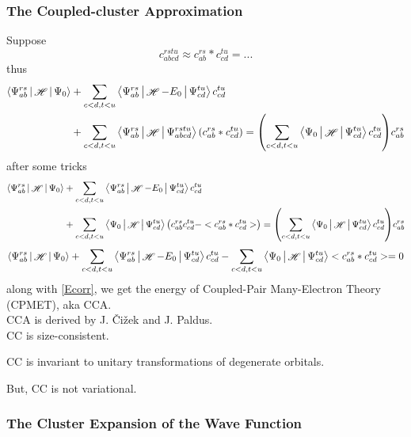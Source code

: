 \documentclass[a4paper]{article}
\DeclareMathOperator{\sH}{\mathscr{H}}
\numberwithin{equation}{section}
\begin{document}
\subsubsection{The Coupled-cluster Approximation}
Suppose
\begin{equation}\label{key}
c_{abcd}^{rstu} \approx c_{ab}^{rs} * c_{cd}^{tu} = ...
\end{equation}
thus
\begin{equation}\label{key}
\begin{aligned}
\Braket{\Psi_{ab}^{rs} | \sH | \Psi_0} &+ \sum_{c<d, t<u} \Braket{\Psi_{ab}^{rs} | \sH - E_0 | \Psi_{cd}^{tu}} c_{cd}^{tu} \\
&+ \sum_{c<d, t<u} \Braket{\Psi_{ab}^{rs} | \sH | \Psi_{abcd}^{rstu}} (c_{ab}^{rs} * c_{cd}^{tu}) = \qty(\sum_{c<d, t<u} \Braket{\Psi_0 | \sH | \Psi_{cd}^{tu}} c_{cd}^{tu}) c_{ab}^{rs} 
\end{aligned}
\end{equation}
after some tricks
\begin{equation}\label{key}
\begin{aligned}
\Braket{\Psi_{ab}^{rs} | \sH | \Psi_0} &+ \sum_{c<d, t<u} \Braket{\Psi_{ab}^{rs} | \sH - E_0 | \Psi_{cd}^{tu}} c_{cd}^{tu} \\
&+ \sum_{c<d, t<u} \Braket{\Psi_0 | \sH | \Psi_{cd}^{tu}} \qty(c_{ab}^{rs} c_{cd}^{tu} - < c_{ab}^{rs} * c_{cd}^{tu} > ) = \qty(\sum_{c<d, t<u} \Braket{\Psi_0 | \sH | \Psi_{cd}^{tu}} c_{cd}^{tu}) c_{ab}^{rs} 
\end{aligned}
\end{equation}
\begin{equation}\label{cca}
\Braket{\Psi_{ab}^{rs} | \sH | \Psi_0} + \sum_{c<d, t<u} \Braket{\Psi_{ab}^{rs} | \sH - E_0 | \Psi_{cd}^{tu}} c_{cd}^{tu} 
- \sum_{c<d, t<u} \Braket{\Psi_0 | \sH | \Psi_{cd}^{tu}} < c_{ab}^{rs} * c_{cd}^{tu} > = 0
\end{equation}
along with \eqref{Ecorr}, we get the energy of Coupled-Pair Many-Electron Theory (CPMET), aka CCA.\\
CCA is derived by J. \v{C}i\v{z}ek and J. Paldus.\\

CC is size-consistent.

CC is invariant to unitary transformations of degenerate orbitals.

But, CC is not variational.


\subsubsection{The Cluster Expansion of the Wave Function}
\end{document}
